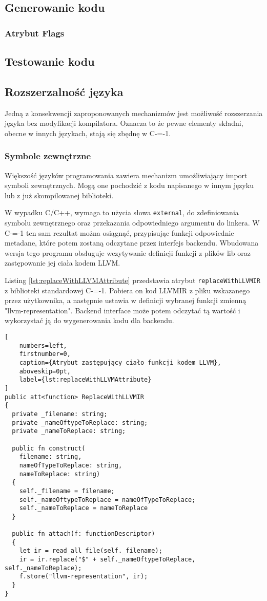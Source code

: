 \subsection{Generowanie kodu}

\subsubsection{Atrybut Flags}

\subsection{Testowanie kodu}

\subsection{Rozszerzalność języka}
\label{Language_extensibility}
Jedną z konsekwencji zaproponowanych mechanizmów jest możliwość rozszerzania języka bez modyfikacji kompilatora.
Oznacza to że pewne elementy składni, obecne w innych językach, stają się zbędnę w C-=-1.
\subsubsection{Symbole zewnętrzne}
Większość języków programowania zawiera mechanizm umożliwiający import symboli zewnętrznych.
Mogą one pochodzić z kodu napisanego w innym języku lub z już skompilowanej biblioteki.

W wypadku C/C++, wymaga to użycia słowa \lstinline{external}, do zdefiniowania symbolu zewnętrznego oraz przekazania odpowiedniego argumentu do linkera.
W C-=-1 ten sam rezultat można osiągnąć, przypisując funkcji odpowiednie metadane, które potem zostaną odczytane przez interfejs backendu.
Wbudowana wersja tego programu obsługuje wczytywanie definicji funkcji z plików lib oraz zastępowanie jej ciała kodem LLVM.

Listing \ref{lst:replaceWithLLVMAttribute} przedstawia atrybut \lstinline{replaceWithLLVMIR} z biblioteki standardowej C-=-1. 
Pobiera on kod LLVMIR z pliku wskazanego przez użytkownika, a następnie ustawia w definicji wybranej funkcji zmienną "llvm-representation".
Backend interface może potem odczytać tą wartość i wykorzystać ją do wygenerowania kodu dla backendu.


\begin{lstlisting}[
    numbers=left,
    firstnumber=0,
    caption={Atrybut zastępujący ciało funkcji kodem LLVM},
    aboveskip=0pt,
    label={lst:replaceWithLLVMAttribute}
]
public att<function> ReplaceWithLLVMIR
{
  private _filename: string;
  private _nameOftypeToReplace: string;
  private _nameToReplace: string;

  public fn construct(
    filename: string,
    nameOfTypeToReplace: string,
    nameToReplace: string)
  {
    self._filename = filename;
    self._nameOftypeToReplace = nameOfTypeToReplace;
    self._nameToReplace = nameToReplace
  }

  public fn attach(f: functionDescriptor)
  {
    let ir = read_all_file(self._filename);
    ir = ir.replace("$" + self._nameOftypeToReplace, self._nameToReplace);
    f.store("llvm-representation", ir);
  }
}

\end{lstlisting}

